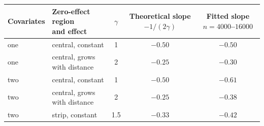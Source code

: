 \begin{tabular}{llccc}
\toprule
Covariates & \makecell{Zero-effect region\\and effect} & $\gamma$ & \makecell{Theoretical slope\\$-1/(2\gamma)$} & \makecell{Fitted slope\\$n=4000$--$16000$} \\
\midrule
one & central, constant & 1 & $-0.50$ & $-0.50$ \\
one & central, grows with distance & 2 & $-0.25$ & $-0.30$ \\
two & central, constant & 1 & $-0.50$ & $-0.61$ \\
two & central, grows with distance & 2 & $-0.25$ & $-0.38$ \\
two & strip, constant & 1.5 & $-0.33$ & $-0.42$ \\
\bottomrule
\end{tabular}
